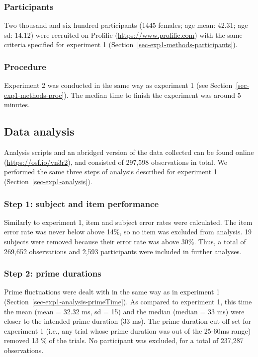 \documentclass[
]{interact}
\begin{document}
\subsubsection{Participants}\label{sec-exp2-methods-participants}

Two thousand and six hundred participants (1445 females; age mean:
42.31; age sd: 14.12) were recruited on Prolific
(\url{https://www.prolific.com}) with the same criteria specified for
experiment 1 (Section~\ref{sec-exp1-methods-participants}).

\subsubsection{Procedure}\label{sec-exp2-methods-proc}

Experiment 2 was conducted in the same way as experiment 1 (see
Section~\ref{sec-exp1-methods-proc}). The median time to finish the
experiment was around 5 minutes.

\subsection{Data analysis}\label{sec-exp2-analysis}

Analysis scripts and an abridged version of the data collected can be
found online (\url{https://osf.io/vn3r2}), and consisted of 297,598
observations in total. We performed the same three steps of analysis
described for experiment 1 (Section~\ref{sec-exp1-analysis}).

\subsubsection{Step 1: subject and item
performance}\label{sec-exp2-analysis-performance}

Similarly to experiment 1, item and subject error rates were calculated.
The item error rate was never below above 14\%, so no item was excluded
from analysis. 19 subjects were removed because their error rate was
above 30\%. Thus, a total of 269,652 observations and 2,593 participants
were included in further analyses.

\subsubsection{Step 2: prime
durations}\label{sec-exp2-analysis-primeTime}

Prime fluctuations were dealt with in the same way as in experiment 1
(Section~\ref{sec-exp1-analysis-primeTime}). As compared to experiment
1, this time the mean (mean = 32.32 ms, sd = 15) and the median (median
= 33 ms) were closer to the intended prime duration (33 ms). The prime
duration cut-off set for experiment 1 (i.e., any trial whose prime
duration was out of the 25-60ms range) removed 13 \% of the trials. No
participant was excluded, for a total of 237,287 observations.
\end{document}
